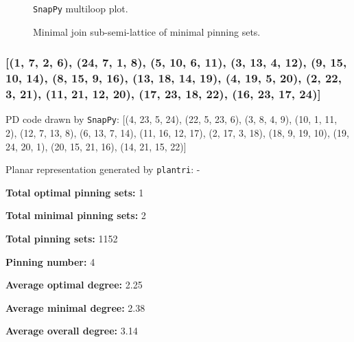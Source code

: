 \documentclass{article}%
\begin{document}
\begin{multicols}{2}
\begin{figure}[H]
\centering

\caption{\texttt{SnapPy} multiloop plot.}
\label{fig:tex/img/[(1, 7, 2, 6), (24, 7, 1, 8), (5, 10, 6, 11), (4, 12, 5, 11), (9, 15, 10, 14), (8, 15, 9, 16), (13, 18, 14, 19), (12, 20, 13, 19), (2, 22, 3, 21), (3, 20, 4, 21), (17, 23, 18, 22), (16, 23, 17, 24)].svg}
\end{figure}
\columnbreak

\begin{figure}[H]
\centering
\scalebox{0.8}{}
\caption{Minimal join sub-semi-lattice of minimal pinning sets.}
\label{fig:tex/img/[(1, 7, 2, 6), (24, 7, 1, 8), (5, 10, 6, 11), (4, 12, 5, 11), (9, 15, 10, 14), (8, 15, 9, 16), (13, 18, 14, 19), (12, 20, 13, 19), (2, 22, 3, 21), (3, 20, 4, 21), (17, 23, 18, 22), (16, 23, 17, 24)].pgf}
\end{figure}
\end{multicols}

\newpage

\subsubsection{[(1, 7, 2, 6), (24, 7, 1, 8), (5, 10, 6, 11), (3, 13, 4, 12), (9, 15, 10, 14), (8, 15, 9, 16), (13, 18, 14, 19), (4, 19, 5, 20), (2, 22, 3, 21), (11, 21, 12, 20), (17, 23, 18, 22), (16, 23, 17, 24)]}

{\small\noindent PD code drawn by \texttt{SnapPy}: [(4, 23, 5, 24), (22, 5, 23, 6), (3, 8, 4, 9), (10, 1, 11, 2), (12, 7, 13, 8), (6, 13, 7, 14), (11, 16, 12, 17), (2, 17, 3, 18), (18, 9, 19, 10), (19, 24, 20, 1), (20, 15, 21, 16), (14, 21, 15, 22)]}

{\small\noindent Planar representation generated by \texttt{plantri}: -}

\begin{multicols}{2}
{\normalsize \noindent\textbf{Total optimal pinning sets:} 1

\noindent\textbf{Total minimal pinning sets:} 2

\noindent\textbf{Total pinning sets:} 1152

\noindent\textbf{Pinning number:} 4

}
\columnbreak

{\normalsize \noindent\textbf{Average optimal degree:} 2.25

\noindent\textbf{Average minimal degree:} 2.38

\noindent\textbf{Average overall degree:} 3.14

}
\end{multicols}
\end{document}

